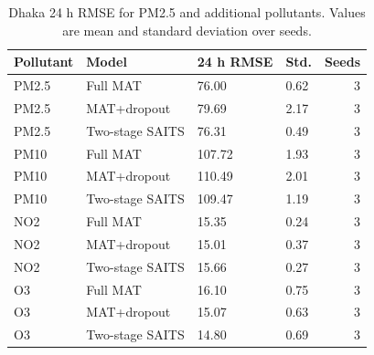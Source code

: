 \begin{table}
\caption{Dhaka 24 h RMSE for PM2.5 and additional pollutants. Values are mean and standard deviation over seeds.}
\label{tab:extra_pollutants}
\begin{tabular}{llllr}
\toprule
Pollutant & Model & 24 h RMSE & Std. & Seeds \\
\midrule
PM2.5 & Full MAT & 76.00 & 0.62 & 3 \\
PM2.5 & MAT+dropout & 79.69 & 2.17 & 3 \\
PM2.5 & Two-stage SAITS & 76.31 & 0.49 & 3 \\
PM10 & Full MAT & 107.72 & 1.93 & 3 \\
PM10 & MAT+dropout & 110.49 & 2.01 & 3 \\
PM10 & Two-stage SAITS & 109.47 & 1.19 & 3 \\
NO2 & Full MAT & 15.35 & 0.24 & 3 \\
NO2 & MAT+dropout & 15.01 & 0.37 & 3 \\
NO2 & Two-stage SAITS & 15.66 & 0.27 & 3 \\
O3 & Full MAT & 16.10 & 0.75 & 3 \\
O3 & MAT+dropout & 15.07 & 0.63 & 3 \\
O3 & Two-stage SAITS & 14.80 & 0.69 & 3 \\
\bottomrule
\end{tabular}
\end{table}
